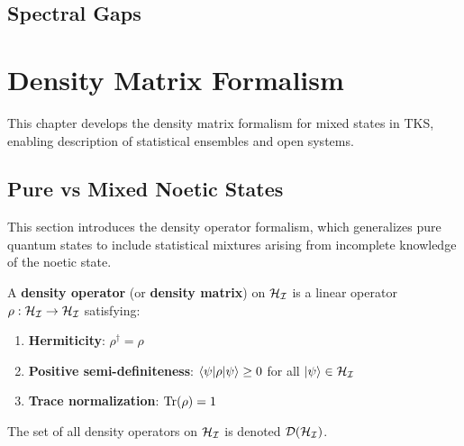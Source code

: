 \section{Spectral Gaps}
\label{sec:spectral-gaps}

\chapter{Density Matrix Formalism}
\label{ch:density-matrix}

\begin{tcolorbox}[colback=blue!5!white,colframe=blue!75!black,title=\vnewthree]
This chapter develops the density matrix formalism for mixed states in TKS, enabling description of statistical ensembles and open systems.
\end{tcolorbox}

\section{Pure vs Mixed Noetic States}
\label{sec:pure-vs-mixed}

This section introduces the density operator formalism, which generalizes pure quantum states to include statistical mixtures arising from incomplete knowledge of the noetic state.

\begin{definition}
\label{def:density-operator}
A \textbf{density operator} (or \textbf{density matrix}) on $\mathcal{H}_{\mathcal{I}}$ is a linear operator $\rho : \mathcal{H}_{\mathcal{I}} \to \mathcal{H}_{\mathcal{I}}$ satisfying:
\begin{enumerate}
  \item \textbf{Hermiticity}: $\rho^\dagger = \rho$
  \item \textbf{Positive semi-definiteness}: $\langle \psi|\rho|\psi\rangle \geq 0$ for all $|\psi\rangle \in \mathcal{H}_{\mathcal{I}}$
  \item \textbf{Trace normalization}: $\mathrm{Tr}(\rho) = 1$
\end{enumerate}
The set of all density operators on $\mathcal{H}_{\mathcal{I}}$ is denoted $\mathcal{D}(\mathcal{H}_{\mathcal{I}})$.
\end{definition}

